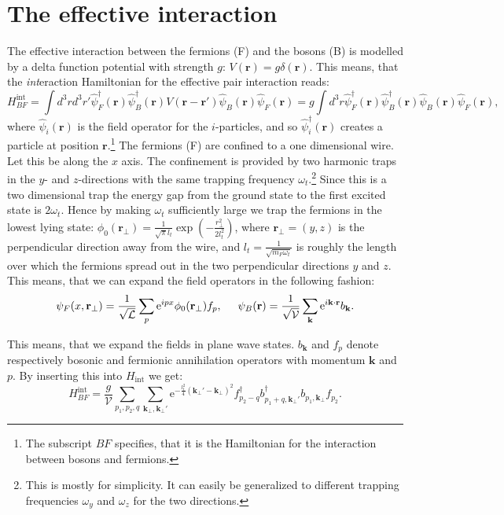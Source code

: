 \section{The effective interaction}
The effective interaction between the fermions (F) and the bosons (B) is modelled by a delta function potential with strength $g$: $V(\mathbf{r})=g\delta(\mathbf{r})$. This means, that the \textit{int}eraction Hamiltonian for the effective pair interaction reads:
\begin{equation}
H_{BF}^\text{int}  = \int d^3 r d^3 r' \hat{\psi}_F^\dagger(\mathbf{r}) \hat{\psi}_B^\dagger(\mathbf{r})V(\mathbf{r}-\mathbf{r}')\hat{\psi}_B(\mathbf{r})\hat{\psi}_F(\mathbf{r}) = g\int d^3 r \hat{\psi}_F^\dagger(\mathbf{r}) \hat{\psi}_B^\dagger(\mathbf{r})\hat{\psi}_B(\mathbf{r})\hat{\psi}_F(\mathbf{r}),
\end{equation}
where $\hat{\psi}_i(\mathbf{r})$ is the field operator for the $i$-particles, and so $\hat{\psi}_i^\dagger(\mathbf{r})$ creates a particle at position $\mathbf{r}$.\footnote{The subscript $BF$ specifies, that it is the Hamiltonian for the interaction between bosons and fermions.} The fermions (F) are confined to a one dimensional wire. Let this be along the $x$ axis. The confinement is provided by two harmonic traps in the $y$- and $z$-directions with the same trapping frequency $\omega_t$.\footnote{This is mostly for simplicity. It can easily be generalized to different trapping frequencies $\omega_y$ and $\omega_z$ for the two directions.} Since this is a two dimensional trap the energy gap from the ground state to the first excited state is $2\omega_t$. Hence by making $\omega_t$ sufficiently large we trap the fermions in the lowest lying state: $\phi_0(\mathbf{r}_\perp) = \frac{1}{\sqrt{\pi}l_t}\exp\left(-\frac{r_\perp^2}{2l_t^2}\right)$, where $\mathbf{r}_\perp = (y,z)$ is the perpendicular direction away from the wire, and $l_t = \frac{1}{\sqrt{m_F \omega_t}}$ is roughly the length over which the fermions spread out in the two perpendicular directions $y$ and $z$. This means, that we can expand the field operators in the following fashion:
\begin{equation}
\psi_F(x,\mathbf{r}_\perp) = \frac{1}{\sqrt{\mathcal{L}}}\sum_p \text{e}^{ipx} \phi_0(\mathbf{r}_\perp) f_p, \hspace{0.5cm} \psi_B(\mathbf{r}) = \frac{1}{\sqrt{\mathcal{V}}}\sum_{\mathbf{k}} \text{e}^{i\mathbf{k}\cdot \mathbf{r}} b_\mathbf{k}. 
\end{equation}   

This means, that we expand the fields in plane wave states. $b_\mathbf{k}$ and $f_p$ denote respectively bosonic and fermionic annihilation operators with momentum $\mathbf{k}$ and $p$.  By inserting this into $H_\text{int}$ we get:
\begin{equation}
H_{BF}^\text{int} = \frac{g}{\mathcal{V}}\sum_{p_1,p_2,q} \sum_{\mathbf{k}_\perp, \mathbf{k}_\perp'} \text{e}^{-\frac{l_t^2}{4}(\mathbf{k}_\perp'-\mathbf{k}_\perp)^2} f_{p_2-q}^\dagger b_{p_1+q, \mathbf{k}_\perp'}^\dagger b_{p_1,\mathbf{k}_\perp}f_{p_2}.
\end{equation}

